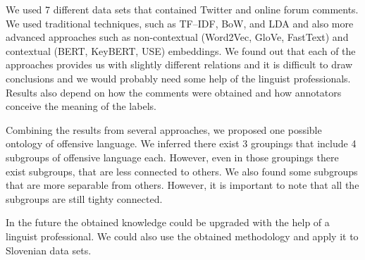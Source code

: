 \documentclass[fleqn,moreauthors,10pt]{ds_report}
\begin{document}
We used 7 different data sets that contained Twitter and online forum comments. We used traditional techniques, such as TF--IDF, BoW, and LDA and also more advanced approaches such as non-contextual (Word2Vec, GloVe, FastText) and contextual (BERT, KeyBERT, USE) embeddings. We found out that each of the approaches provides us with slightly different relations and it is difficult to draw conclusions and we would probably need some help of the linguist professionals. Results also depend on how the comments were obtained and how annotators conceive the meaning of the labels. 

Combining the results from several approaches, we proposed one possible ontology of offensive language.
We inferred there exist 3 groupings that include 4 subgroups of offensive language each. However, even in those groupings there exist subgroups, that are less connected to others. We also found some subgroups that are more separable from others. However, it is important to note that all the subgroups are still tighty connected.

In the future the obtained knowledge could be upgraded with the help of a linguist professional. We could also use the obtained methodology and apply it to Slovenian data sets.



\end{document}
